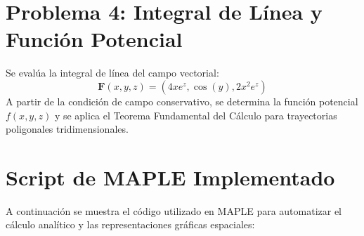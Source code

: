 \documentclass[11pt,a4paper]{article}
\begin{document}
\section{Problema 4: Integral de Línea y Función Potencial}
Se evalúa la integral de línea del campo vectorial:
$$\mathbf{F}(x,y,z) = \left(4xe^z, \cos(y), 2x^2e^z\right)$$
A partir de la condición de campo conservativo, se determina la función potencial $f(x,y,z)$ y se aplica el Teorema Fundamental del Cálculo para trayectorias poligonales tridimensionales.

\section{Script de MAPLE Implementado}
A continuación se muestra el código utilizado en MAPLE para automatizar el cálculo analítico y las representaciones gráficas espaciales:
\end{document}
